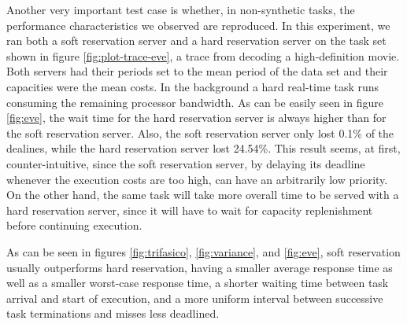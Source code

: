 \documentclass[times, 10pt,twocolumn]{article}
\begin{document}
Another very important test case is whether, in non-synthetic tasks,
the performance characteristics we observed are reproduced. In this
experiment, we ran both a soft reservation server and a hard
reservation server on the task set shown in figure
\ref{fig:plot-trace-eve}, a trace from decoding a high-definition
movie. Both servers had their periods set to the mean period of the
data set and their capacities were the mean costs. In the background a
hard real-time task runs consuming the remaining processor
bandwidth. As can be easily seen in figure \ref{fig:eve}, the wait
time for the hard reservation server is always higher than for the
soft reservation server. Also, the soft reservation server only lost
0.1\% of the dealines, while the hard reservation server lost
24.54\%. This result seems, at first, counter-intuitive, since the
soft reservation server, by delaying its deadline whenever the
execution costs are too high, can have an arbitrarily low priority. On
the other hand, the same task will take more overall time to be served
with a hard reservation server, since it will have to wait for
capacity replenishment before continuing execution.


\label{sec:conclusion}

As can be seen in figures \ref{fig:trifasico}, \ref{fig:variance}, and
\ref{fig:eve}, soft reservation usually outperforms hard reservation,
having a smaller average response time as well as a smaller worst-case
response time, a shorter waiting time between task arrival and start
of execution, and a more uniform interval between successive task
terminations and misses less deadlined.



\end{document}
